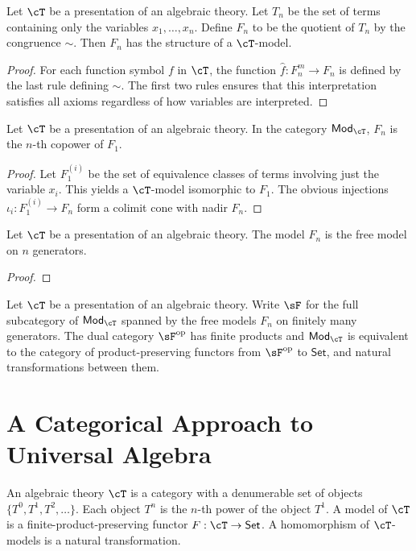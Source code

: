 \documentclass{amsart}
\begin{document}
\begin{lem}
  Let $\cT$ be a presentation of an algebraic theory.
  Let $T_{n}$ be the set of terms containing only the variables $x_{1},\ldots,x_{n}$.
  Define $F_{n}$ to be the quotient of $T_{n}$ by the congruence $\sim$.
  Then $F_{n}$ has the structure of a $\cT$-model.
\end{lem}
\begin{proof}
  For each function symbol $f$ in $\cT$, the function $\hat{f} : F_{n}^{m} \to F_{n}$ is defined by
  the last rule defining $\sim$.
  The first two rules ensures that this interpretation satisfies all axioms regardless of how variables are interpreted.
\end{proof}

\begin{lem}
  Let $\cT$ be a presentation of an algebraic theory.
  In the category $\mathsf{Mod}_{\cT}$, $F_{n}$ is the $n$-th copower of $F_{1}$.
\end{lem}
\begin{proof}
  Let $F_{1}^{(i)}$ be the set of equivalence classes of terms involving just the variable $x_{i}$.
  This yields a $\cT$-model isomorphic to $F_{1}$.
  The obvious injections $\iota_{i} : F_{1}^{(i)} \to F_{n}$ form a colimit cone with nadir $F_{n}$.
\end{proof}

\begin{lem}
  Let $\cT$ be a presentation of an algebraic theory.
  The model $F_{n}$ is the free model on $n$ generators.
\end{lem}
\begin{proof}
  
\end{proof}

\begin{lem}
  Let $\cT$ be a presentation of an algebraic theory.
  Write $\sF$ for the full subcategory of $\mathsf{Mod}_{\cT}$ spanned by the free models $F_{n}$ on finitely many generators.
  The dual category $\sF\op$ has finite products and $\mathsf{Mod}_{\cT}$ is equivalent to the category of product-preserving functors from $\sF\op$ to $\mathsf{Set}$, and natural transformations between them.
\end{lem}

\section{A Categorical Approach to Universal Algebra}
\label{sec:a-categorical-approach-to-universal-algebra}

\begin{defn}
  An algebraic theory $\cT$ is a category with a denumerable set of objects $\{T^{0}, T^{1}, T^{2}, \ldots\}$.
  Each object $T^{n}$ is the $n$-th power of the object $T^{1}$.
  A model of $\cT$ is a finite-product-preserving functor $F : \cT \to \mathsf{Set}$.
  A homomorphism of $\cT$-models is a natural transformation.
\end{defn}



\end{document}
